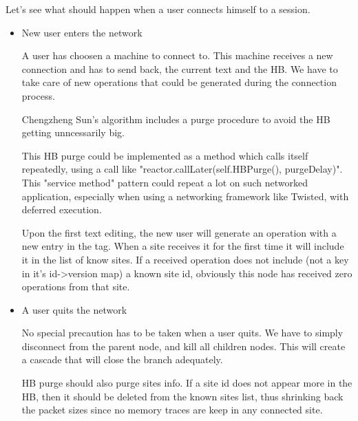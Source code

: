\documentclass{article}
\begin{document}
Let's see what should happen when a user connects himself to a session.
\begin{itemize}
\item New user enters the network

A user has choosen a machine to connect to. This machine receives a new connection and has to send back, the current text and the HB. We have to take care of new operations that could be generated during the connection process.

Chengzheng Sun's algorithm includes a purge procedure to avoid the HB getting unncessarily big.

This HB purge could be implemented as a method which calls itself repeatedly, using a call like "reactor.callLater(self.HBPurge(), purgeDelay)". This "service method" pattern could repeat a lot on such networked application, especially when using a networking framework like Twisted, with deferred execution.

Upon the first text editing, the new user will generate an operation with a new entry in the tag. When a site receives it for the first time it will include it in the list of know sites. If a received operation does not include (not a key in it's id->version map) a known site id, obviously this node has received zero operations from that site.


\item A user quits the network

No special precaution has to be taken when a user quits. We have to simply disconnect from the parent node, and kill all children nodes. This will create a cascade that will close the branch adequately.



      
HB purge should also purge sites info. If a site id does not appear more in the HB, then it should be deleted from the known sites list, thus shrinking back the packet sizes since no memory traces are keep in any connected site.
\end{itemize}
\end{document}
